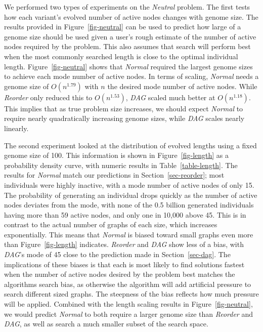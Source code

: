 \documentclass{sig-alternate}
\begin{document}
We performed two types of experiments on the \emph{Neutral} problem.  The first
tests how each variant's evolved number of active nodes changes
with genome size.  The results provided in Figure~\ref{fig-neutral} can be used
to predict how large of a genome size should be used
given a user's rough estimate of the number of active nodes required by the problem.  
This also assumes that search will perform best when the most commonly searched length
is close to the optimal individual length.  Figure~\ref{fig-neutral} shows that \emph{Normal}
required the largest genome sizes to achieve each mode number of active nodes.  In
terms of scaling, \emph{Normal} needs a genome size of $O(n^{1.79})$ with
$n$ the desired mode number of active nodes.  While \emph{Reorder} only reduced
this to $O(n^{1.53})$, \emph{DAG} scaled much better at $O(n^{1.18})$.  This implies
that as true problem size increases, we should expect \emph{Normal} to require nearly
quadratically increasing genome sizes, while \emph{DAG} scales nearly linearly.

The second experiment looked at the distribution of evolved lengths using a fixed
genome size of 100. This
information is shown in Figure~\ref{fig-length} as a probability density curve,
with numeric results in Table~\ref{table-length}.
The results for \emph{Normal} match our predictions in Section~\ref{sec-reorder};
most individuals were highly inactive, with a mode number of
active nodes of only 15.  The probability of generating an individual drops quickly
as the number of active nodes deviates from the mode, with none of the 0.5 billion
generated individuals having more than 59 active nodes, and only one in 10,000 above 45.  This is in contrast
to the actual number of graphs of each size, which increases exponentially.
This means that \emph{Normal} is biased toward small graphs even more than
Figure~\ref{fig-length} indicates.
\emph{Reorder} and \emph{DAG} show less of a bias, with \emph{DAG}'s mode of 45
close to the prediction made in Section~\ref{sec-dag}.  The implications of these
biases is that each is most likely to find solutions fastest when the number of
active nodes desired by the problem best matches the algorithms search bias, as
otherwise the algorithm will add artificial pressure to search different sized
graphs.  The steepness of the bias reflects how much pressure will be applied.
Combined with the length scaling results in Figure~\ref{fig-neutral}, we would
predict \emph{Normal} to both require a larger genome size than \emph{Reorder} and \emph{DAG},
as well as search a much smaller subset of the search space.
\end{document}
